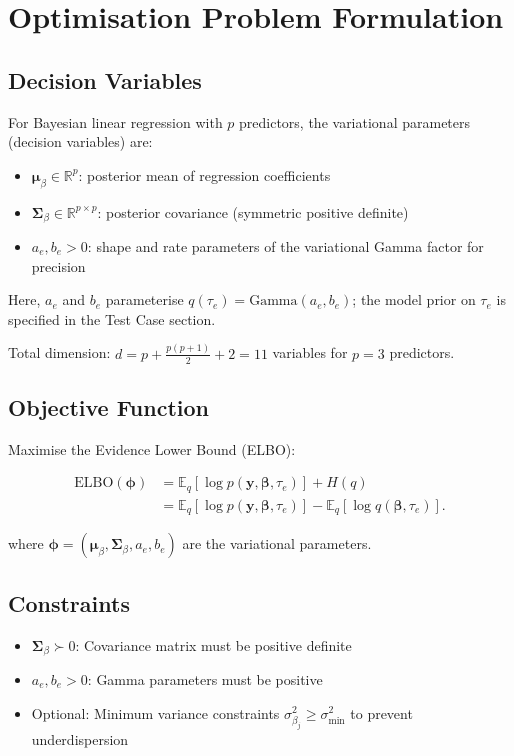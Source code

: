 \documentclass[11pt]{article}
\newcommand{\E}{\mathbb{E}}
\newcommand{\R}{\mathbb{R}}
\newcommand{\ELBO}{\text{ELBO}}
\begin{document}
\section*{Optimisation Problem Formulation}

\subsection*{Decision Variables}

For Bayesian linear regression with $p$ predictors, the variational parameters (decision variables) are:
\begin{itemize}
\item $\bm{\mu}_\beta \in \R^p$: posterior mean of regression coefficients
\item $\bm{\Sigma}_\beta \in \R^{p \times p}$: posterior covariance (symmetric positive definite)
\item $a_e, b_e > 0$: shape and rate parameters of the variational Gamma factor for precision
\end{itemize}

Here, $a_e$ and $b_e$ parameterise $q(\tau_e)=\mathrm{Gamma}(a_e,b_e)$; the model prior on $\tau_e$ is specified in the Test Case section.

Total dimension: $d = p + \frac{p(p+1)}{2} + 2 = 11$ variables for $p=3$ predictors.

\subsection*{Objective Function}

Maximise the Evidence Lower Bound (ELBO):

\begin{align}
\ELBO(\bm{\phi})
&= \E_q[\log p(\bm{y}, \bm{\beta}, \tau_e)] + H(q) \\
&= \E_q[\log p(\bm{y}, \bm{\beta}, \tau_e)] - \E_q[\log q(\bm{\beta}, \tau_e)] .
\end{align}


where $\bm{\phi} = (\bm{\mu}_\beta, \bm{\Sigma}_\beta, a_e, b_e)$ are the variational parameters.

\subsection*{Constraints}

\begin{itemize}
\item $\bm{\Sigma}_\beta \succ 0$: Covariance matrix must be positive definite
\item $a_e, b_e > 0$: Gamma parameters must be positive
\item Optional: Minimum variance constraints $\sigma^2_{\beta_j} \geq \sigma^2_{\text{min}}$ to prevent underdispersion
\end{itemize}
\end{document}
